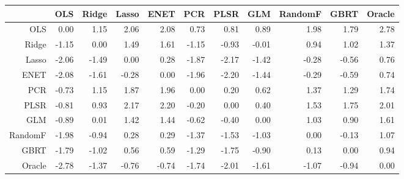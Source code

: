 \begin{table}[ht]
\centering
\begin{tabular}{rrrrrrrrrrr}
  \hline
 & OLS & Ridge & Lasso & ENET & PCR & PLSR & GLM & RandomF & GBRT & Oracle \\ 
  \hline
OLS & 0.00 & 1.15 & 2.06 & 2.08 & 0.73 & 0.81 & 0.89 & 1.98 & 1.79 & 2.78 \\ 
  Ridge & -1.15 & 0.00 & 1.49 & 1.61 & -1.15 & -0.93 & -0.01 & 0.94 & 1.02 & 1.37 \\ 
  Lasso & -2.06 & -1.49 & 0.00 & 0.28 & -1.87 & -2.17 & -1.42 & -0.28 & -0.56 & 0.76 \\ 
  ENET & -2.08 & -1.61 & -0.28 & 0.00 & -1.96 & -2.20 & -1.44 & -0.29 & -0.59 & 0.74 \\ 
  PCR & -0.73 & 1.15 & 1.87 & 1.96 & 0.00 & 0.20 & 0.62 & 1.37 & 1.29 & 1.74 \\ 
  PLSR & -0.81 & 0.93 & 2.17 & 2.20 & -0.20 & 0.00 & 0.40 & 1.53 & 1.75 & 2.01 \\ 
  GLM & -0.89 & 0.01 & 1.42 & 1.44 & -0.62 & -0.40 & 0.00 & 1.03 & 0.90 & 1.61 \\ 
  RandomF & -1.98 & -0.94 & 0.28 & 0.29 & -1.37 & -1.53 & -1.03 & 0.00 & -0.13 & 1.07 \\ 
  GBRT & -1.79 & -1.02 & 0.56 & 0.59 & -1.29 & -1.75 & -0.90 & 0.13 & 0.00 & 0.94 \\ 
  Oracle & -2.78 & -1.37 & -0.76 & -0.74 & -1.74 & -2.01 & -1.61 & -1.07 & -0.94 & 0.00 \\ 
   \hline
\end{tabular}
\end{table}
